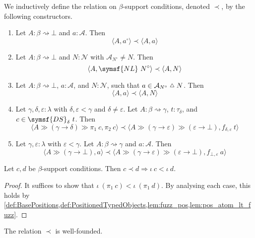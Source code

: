 \begin{definition}
    \label{def:Constrains}
    We inductively define the  relation on \( \beta \)-support conditions, denoted \( \prec \), by the following constructors.
    \begin{enumerate}
        \item Let \( A : \beta \rightsquigarrow \bot \) and \( a : \mathcal A \).
        Then
        \[ \langle A, a^\circ \rangle \prec \langle A, a \rangle \]
        \item Let \( A : \beta \rightsquigarrow \bot \) and \( N : \mathcal N \) with \( \mathcal A_{N^\circ} \neq N \).
        Then
        \[ \langle A, \symsf{NL}\ N^\circ \rangle \prec \langle A, N \rangle \]
        \item Let \( A : \beta \rightsquigarrow \bot \), \( a : \mathcal A \), and \( N : \mathcal N \), such that \( a \in \mathcal A_{N^\circ} \symmdiff N \).
        Then
        \[ \langle A, a \rangle \prec \langle A, N \rangle \]
        \item Let \( \gamma, \delta, \varepsilon : \lambda \) with \( \delta, \varepsilon < \gamma \) and \( \delta \neq \varepsilon \).
        Let \( A : \beta \rightsquigarrow \gamma \), \( t : \tau_\delta \), and \( c \in \symsf{DS}_\delta\ t \).
        Then
        \[ \langle A \gg (\gamma \to \delta) \gg \pi_1\ c, \pi_2\ c \rangle \prec \langle A \gg (\gamma \to \varepsilon) \gg (\varepsilon \to \bot), f_{\delta, \varepsilon}\ t \rangle \]
        \item Let \( \gamma, \varepsilon : \lambda \) with \( \varepsilon < \gamma \).
        Let \( A : \beta \rightsquigarrow \gamma \) and \( a : \mathcal A \).
        Then
        \[ \langle A \gg (\gamma \to \bot), a \rangle \prec \langle A \gg (\gamma \to \varepsilon) \gg (\varepsilon \to \bot), f_{\bot, \varepsilon}\ a \rangle \]
    \end{enumerate}
\end{definition}
\begin{lemma}
    Let \( c, d \) be \( \beta \)-support conditions.
    Then \( c \prec d \Rightarrow \iota\ c < \iota\ d \).
\end{lemma}
\begin{proof}
    It suffices to show that \( \iota\ (\pi_1\ c) < \iota\ (\pi_1\ d) \).
    By analysing each case, this holds by \cref{def:BasePositions,def:PositionedTypedObjects,lem:fuzz_pos,lem:pos_atom_lt_fuzz}.
\end{proof}
\begin{lemma}
    The relation \( \prec \) is well-founded.
\end{lemma}
